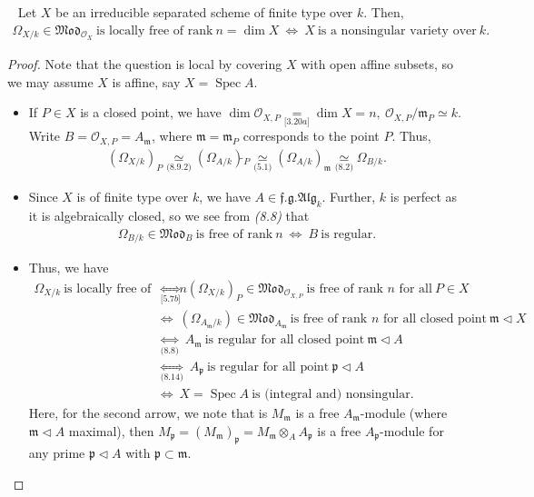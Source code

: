 \documentclass[11pt,a4paper,footinclude=true,headinclude=true]{scrbook} %
\DeclareMathOperator{\Spec}{Spec}
\newcommand{\OO}{\mathcal{O}}
\newcommand{\pp}{\mathfrak{p}}
\newcommand{\mm}{\mathfrak{m}}
\newcommand{\<}{\langle}
\newcommand{\>}{\rangle}
\newcommand{\fg}{\mathfrak{f.g.}}
\newcommand{\MOD}{\mathfrak{Mod}}
\newcommand{\ALG}{\mathfrak{Alg}}
\newenvironment{theorem}[2][]
{\renewcommand\theinnercustomthm{#2}\innercustomthm[#1]
\begin{mdframed}[backgroundcolor=yellow!20]\ }
{\end{mdframed}\endinnercustomthm}
\begin{document}
\begin{theorem}{8.15}
    Let $X$ be an irreducible separated scheme of finite type over $k$. Then,
    \begin{align*}
        \Omega_{X/k}\in\MOD_{\OO_X}\ \text{is locally free of rank}\ n=\dim X\ \Longleftrightarrow\ X\ \text{is a nonsingular variety over}\ k.         
    \end{align*}
\end{theorem}
\begin{proof}
    Note that the question is local by covering $X$ with open affine subsets, so we may assume $X$ is affine, say $X=\Spec A$. 
    \begin{itemize}
        \item If $P\in X$ is a closed point, we have $\dim\OO_{X,P}\underset{\textit{[3.20a]}}{=}\dim X=n,\ \OO_{X,P}/\mm_P\simeq k$. Write $B=\OO_{X,P}=A_\mm$, where $\mm=\mm_P$ corresponds to the point $P$. Thus,
        \begin{align*}
            (\Omega_{X/k})_P\underset{\textit{(8.9.2)}}{\simeq}(\Omega_{A/k})\widetilde{}_P\underset{\textit{(5.1)}}{\simeq}(\Omega_{A/k})_\mm\underset{\textit{(8.2)}}{\simeq}\Omega_{B/k}.
        \end{align*}
        \item Since $X$ is of finite type over $k$, we have $A\in\fg\ALG_k$. Further, $k$ is perfect as it is algebraically closed, so we see from \textit{(8.8)} that
        \begin{align*}
            \Omega_{B/k}\in\MOD_B\ \text{is free of rank}\ n\ \Longleftrightarrow\ B\ \text{is regular}.
        \end{align*}
        \item Thus, we have
        \begin{align*}
            \Omega_{X/k}\ \text{is locally free of rank}\ n &\underset{\textit{[5.7b]}}{\Longleftrightarrow}\ (\Omega_{X/k})_P\in\MOD_{\OO_{X,P}}\ \text{is free of rank $n$ for all}\ P\in X\\ &\Longleftrightarrow\ (\Omega_{A_\mm/k})\in\MOD_{A_\mm}\ \text{is free of rank $n$ for all closed point}\ \mm\triangleleft X\\ &\underset{\textit{(8.8)}}{\Longleftrightarrow}\ A_\mm\ \text{is regular for all closed point}\ \mm\triangleleft A\\
            &\underset{\textit{(8.14)}}{\Longleftrightarrow}\ A_\pp\ \text{is regular for all point}\ \pp\triangleleft A\\
            &\Longleftrightarrow\ X=\Spec A\ \text{is (integral and) nonsingular}.
        \end{align*}
        Here, for the second arrow, we note that is $M_\mm$ is a free $A_\mm$-module (where $\mm\triangleleft A$ maximal), then $M_\pp=(M_\mm)_\pp=M_\mm\otimes_AA_\pp$ is a free $A_\pp$-module for any prime $\pp\triangleleft A$ with $\pp\subset\mm$.
    \end{itemize}
\end{proof}
\end{document}
